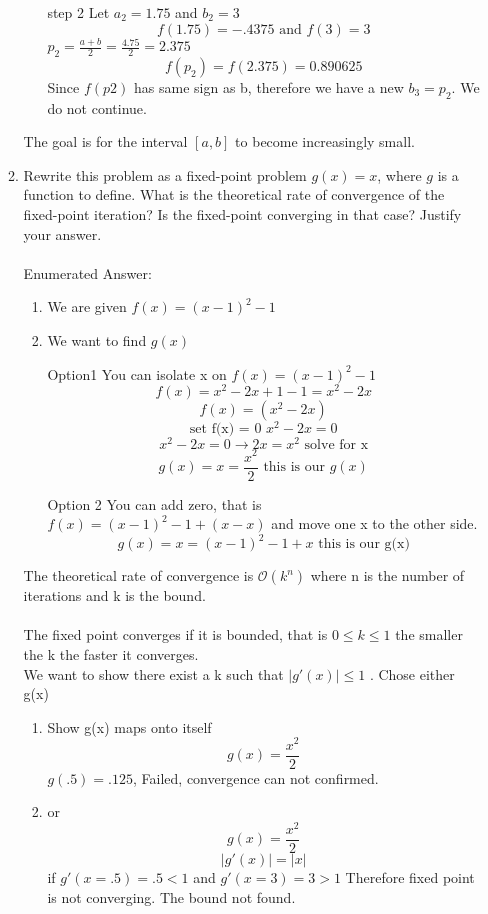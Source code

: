 \documentclass{article}
\begin{document}
\begin{enumerate}
\begin{enumerate}
\begin{enumerate}
                 \item[step 2] Let $a_2 = 1.75$ and $b_2 = 3$
                 $$f(1.75) = -.4375 \text{ and } f(3) = 3$$
                 $p_2 = \frac{a + b}{2} = \frac{4.75}{2}  = 2.375$\\
                $$f(p_2) = f(2.375) =  0.890625$$
                 Since $f(p2)$ has same sign as b, therefore we have a new $b_3 = p_2$. We do not continue. \\
            \end{enumerate}
            The goal is for the interval $[a,b]$ to become increasingly small. 
        \color{black}
        \item Rewrite this problem as a fixed-point problem $g(x) = x$, where $g$ is a function to define. What is the theoretical rate of convergence of the fixed-point iteration? Is the fixed-point converging in that case? Justify your answer.\\
        \\
        \color{red}
            Enumerated Answer:\\
            \begin{enumerate}
                \item We are given $f(x) = (x-1)^2 - 1$
                \item We want to find $g(x)$ 
                \item[Option1 ] You can isolate x on $f(x) = (x-1)^2 - 1$
                $$f(x) = x^2 - 2x + 1 - 1 = x^2 - 2x$$
                $$f(x) = (x^2 - 2x)$$
                $$\text{set f(x) = 0 } x^2 - 2x = 0 $$
                $$x^2 - 2x = 0 \rightarrow 2x = x^2 \text{ solve for x} $$
                $$g(x) = x = \frac{x^2}{2} \text{ this is our } g(x)$$
                \item[Option 2]You can add zero, that is $f(x) = (x -1)^2 - 1 + (x - x)$ and move one x to the other side. 
                $$g(x) = x = (x-1)^2 - 1 + x \text{ this is our g(x)}$$
            \end{enumerate}
            The theoretical rate of convergence is $\mathcal{O}(k^n)$ where n is the number of iterations and k is the bound. \\\\
            The fixed point converges if it is bounded, that is $0 \leq k \leq 1$ the smaller the k the faster it converges. \\
            We want to show there exist a k such that $|g'(x)| \leq 1$ . Chose either g(x)
            \begin{enumerate}
                \item Show g(x) maps onto itself
                $$g(x) = \frac{x^2}{2}$$
                $g(.5) = .125$,  Failed, convergence can not confirmed. 
                \item or $$g(x) = \frac{x^2}{2}$$
            $$|g'(x)| = |x|$$
            if $g'(x = .5) = .5 < 1$ and $g'(x = 3) = 3 > 1$
            Therefore fixed point is not converging. The bound not found. 
            \end{enumerate}
            

\end{enumerate}
\end{enumerate}
\end{document}
